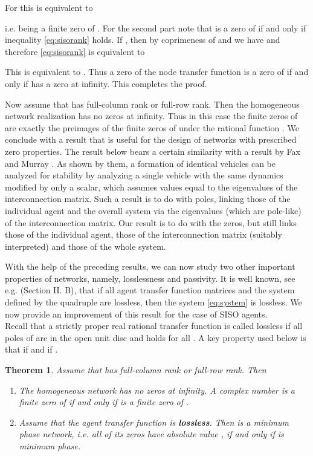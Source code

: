 \documentclass[twocolumn]{autart}    \usepackage{amsmath}
\newtheorem{theorem}{Theorem}
\begin{document}
For  this is equivalent to

i.e.   being a finite zero of .  For the second
part note that  is a zero of  if and only if  inequality \eqref{eq:sisorank} holds.   If , then by
coprimeness of  and  we have  and  therefore
\eqref{eq:sisorank} is equivalent to

This is equivalent to .
Thus a zero of the node transfer function  is a zero of
 if and only if  has
a zero at infinity. This completes the proof.
\hfill 






Now assume that  has full-column rank or full-row rank. Then the
homogeneous network realization 
has no zeros at infinity. Thus in this case the finite zeros of
 are exactly the preimages of the finite
zeros of  under the rational function .
We conclude with a result that is useful for the design of networks
with prescribed zero properties. The result below bears a certain
similarity with a result by Fax and Murray \cite{fax2004}.
As shown by them, a formation of  identical vehicles can be analyzed for stability by analyzing a single vehicle with the same dynamics modified   by only a scalar, which assumes values equal to the eigenvalues of the interconnection matrix. Such a result is to do with poles, linking those of the individual agent  and the overall system via the eigenvalues (which are pole-like) of the interconnection matrix.  Our result is to do with the zeros, but  still links those of the individual agent, those of the interconnection matrix (suitably interpreted) and those of the whole system.


With the help of the preceding results, we can now study two other
important properties of  networks, namely, losslessness and
passivity. It is well known, see  e.g. \cite{vaidyanathan1989role}
(Section II. B), that if all agent  transfer function matrices and the
system defined by the quadruple  are lossless, then the
system \eqref{eq:system} is lossless. We now provide an
improvement of this result for the case of SISO agents.\\




Recall  that a strictly proper real rational transfer
function  is called lossless \cite{vaid93} if all poles of  are in the open
unit disc and  holds for all . A key property used below is that  if  and  if .


\begin{theorem}\label{cor:homog-network} Assume that  has full-column   rank or full-row rank. Then
\begin{enumerate}
\item The homogeneous network 
  has no zeros at infinity. A complex number  is a finite zero of
   if and only if  is a
  finite zero of .
\item Assume that the agent transfer function  is \textbf{lossless}. Then  is a minimum phase
  network, i.e. all of its zeros have absolute value , if and only
  if  is minimum phase.
\end{enumerate}
\end{theorem}
\end{document}
